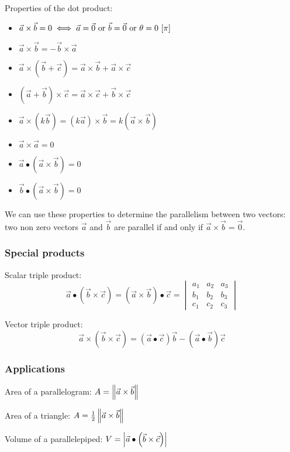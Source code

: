 \documentclass[10pt, twocolumn]{article}
\theoremstyle{remark}
\begin{document}
Properties of the dot product:
\begin{itemize}
  \item \(\vec{a} \times \vec{b} = 0 \iff \vec{a} = \vec{0} \text{ or } \vec{b} = \vec{0} \text{ or } \theta = 0 \,\left[ \pi \right]\)
  \item \(\vec{a} \times \vec{b} = -\vec{b} \times \vec{a}\)
  \item \(\vec{a} \times (\vec{b} + \vec{c}) = \vec{a} \times \vec{b} + \vec{a} \times \vec{c}\)
  \item \((\vec{a} + \vec{b}) \times \vec{c} = \vec{a} \times \vec{c} + \vec{b} \times \vec{c}\)
  \item \(\vec{a} \times (k\vec{b}) = (k\vec{a}) \times \vec{b} = k(\vec{a} \times \vec{b})\)
  \item \(\vec{a} \times \vec{a} = 0\)
  \item \(\vec{a} \bullet (\vec{a} \times \vec{b}) = 0\)
  \item \(\vec{b} \bullet (\vec{a} \times \vec{b}) = 0\)
\end{itemize}

We can use these properties to determine the parallelism between two vectors: two non zero vectors \(\vec{a}\) and \(\vec{b}\) are parallel if and only if \(\vec{a} \times \vec{b} = \vec{0}\).

\subsubsection*{Special products}
Scalar triple product:
\[
  \vec{a} \bullet (\vec{b} \times \vec{c}) = ( \vec{a} \times \vec{b}) \bullet \vec{c} =
  \begin{vmatrix}
    a_1 & a_2 & a_3 \\
    b_1 & b_2 & b_3 \\
    c_1 & c_2 & c_3
  \end{vmatrix}
\]

Vector triple product:
\[
  \vec{a} \times (\vec{b} \times \vec{c}) = (\vec{a} \bullet \vec{c})\vec{b} - (\vec{a} \bullet \vec{b})\vec{c}
\]

\subsubsection*{Applications}
Area of a parallelogram: \(A = \left\| \vec{a} \times \vec{b} \right\|\)

Area of a triangle: \(A = \frac{1}{2}\left\| \vec{a} \times \vec{b} \right\|\)

Volume of a parallelepiped: \(V = \left| \vec{a} \bullet \left( \vec{b} \times \vec{c} \right) \right|\)
\end{document}
